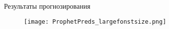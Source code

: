\documentclass{beamer}
\begin{document}
\begin{frame}{Результаты прогнозирования}

\begin{figure}[h] 
    \centering
    \texttt{[image: ProphetPreds\_largefonstsize.png]}
    \label{fig:ProphetPreds}
\end{figure}


\end{frame}





\end{document}
